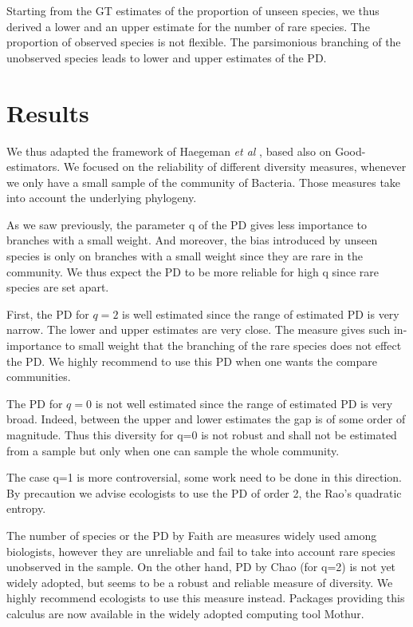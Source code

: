 \documentclass{article}
\begin{document}
Starting from the GT estimates of the proportion of unseen species, we thus derived a lower and an upper estimate for the number of rare species. The proportion of observed species is not flexible.
The parsimonious branching of the unobserved species leads to lower and upper estimates of the PD.


\section*{Results}


We thus adapted the framework of Haegeman \textit{et al} \cite{Haegeman2013}, based also on Good-estimators. 
We focused on the reliability of different diversity measures, whenever we only have a small sample of the community of Bacteria. Those measures take into account the underlying phylogeny. 

As we saw previously, the parameter q of the PD gives less importance to branches with a small weight.
And moreover, the bias introduced by unseen species is only on branches with a small weight since they are rare in the community.
We thus expect the PD to be more reliable for high q since rare species are set apart.

First, the PD for $q=2$ is well estimated since the range of estimated PD is very narrow. The lower and upper estimates are very close.
The measure gives such in-importance to small weight that the branching of the rare species does not effect the PD.
We highly recommend to use this PD when one wants the compare communities. 


The PD for $q=0$ is not well estimated since the range of estimated PD is very broad. 
Indeed, between the upper and lower estimates the gap is of some order of magnitude. 
Thus this diversity for q=0 is not robust and shall not be estimated from a sample but only when one can sample the whole community.

The case q=1 is more controversial, some work need to be done in this direction. By precaution we advise ecologists to use the PD of order 2, the Rao's quadratic entropy.

The number of species or the PD by Faith are measures widely used among biologists, however they are unreliable and fail to take into account rare species unobserved in the sample.
On the other hand, PD by Chao (for q=2) is not yet widely adopted, but seems to be a robust and reliable measure of diversity. 
We highly recommend ecologists to use this measure instead. Packages providing this calculus are now available in the widely adopted computing tool Mothur.
\end{document}
